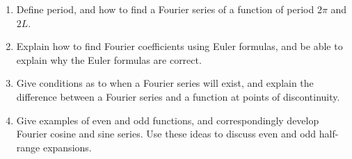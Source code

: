 
\begin{enumerate}

\item Define period, and how to find a Fourier series of a function of period $2\pi$ and $2L$. 
\item Explain how to find Fourier coefficients using Euler formulas, and be able to explain why the Euler formulas are correct.
\item Give conditions as to when a Fourier series will exist, and explain the difference between a Fourier series and a function at points of discontinuity.
\item Give examples of even and odd functions, and correspondingly develop Fourier cosine and sine series.  Use these ideas to discuss even and odd half-range expansions.

\end{enumerate}
